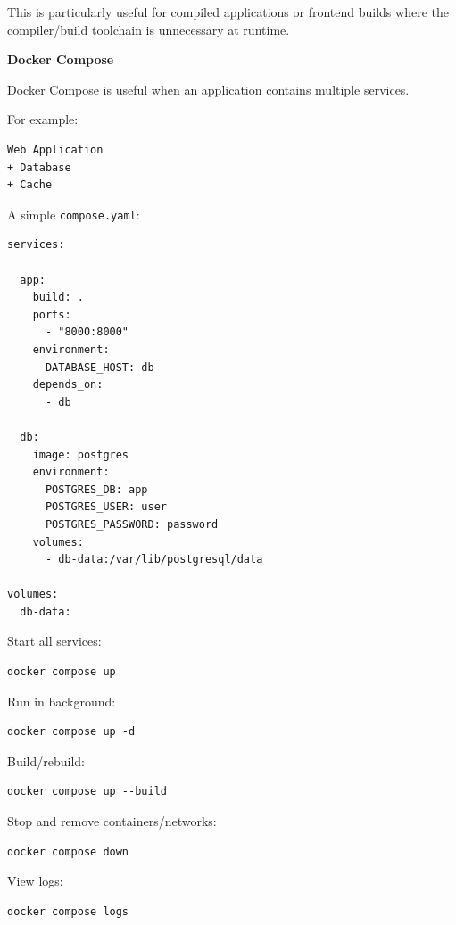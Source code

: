 \documentclass[11pt,letterpaper]{article}
\begin{document}
This is particularly useful for compiled applications or frontend builds where
the compiler/build toolchain is unnecessary at runtime.



\textbf{Docker Compose}

Docker Compose is useful when an application contains multiple services.

For example:

\begin{lstlisting}
Web Application
+ Database
+ Cache
\end{lstlisting}

A simple \texttt{compose.yaml}:

\begin{lstlisting}
services:

  app:
    build: .
    ports:
      - "8000:8000"
    environment:
      DATABASE_HOST: db
    depends_on:
      - db

  db:
    image: postgres
    environment:
      POSTGRES_DB: app
      POSTGRES_USER: user
      POSTGRES_PASSWORD: password
    volumes:
      - db-data:/var/lib/postgresql/data

volumes:
  db-data:
\end{lstlisting}

Start all services:

\begin{lstlisting}
docker compose up
\end{lstlisting}

Run in background:

\begin{lstlisting}
docker compose up -d
\end{lstlisting}

Build/rebuild:

\begin{lstlisting}
docker compose up --build
\end{lstlisting}

Stop and remove containers/networks:

\begin{lstlisting}
docker compose down
\end{lstlisting}

View logs:

\begin{lstlisting}
docker compose logs
\end{lstlisting}
\end{document}
